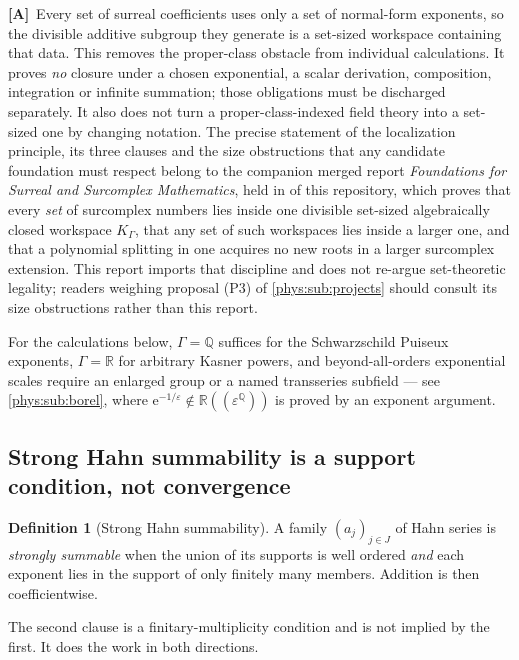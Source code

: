 \documentclass[11pt,letterpaper]{article}
\numberwithin{equation}{section}
\theoremstyle{definition}
\newtheorem{definition}[theorem]{Definition}
\theoremstyle{remark}
\newcommand{\R}{\mathbb R}
\newcommand{\Q}{\mathbb Q}
\newcommand{\eps}{\varepsilon}
\newcommand{\ee}{\mathrm e}
\newcommand{\TA}{\textcolor{TierA}{\textsf{\bfseries[A]}}}
\begin{document}
\TA\ Every set of surreal coefficients uses only a set of normal-form
exponents, so the divisible additive subgroup they generate is a set-sized
workspace containing that data. This removes the proper-class obstacle from
individual calculations. It proves \emph{no} closure under a chosen
exponential, a scalar derivation, composition, integration or infinite
summation; those obligations must be discharged separately. It also does not
turn a proper-class-indexed field theory into a set-sized one by changing
notation. The precise statement of the localization principle, its three
clauses and the size obstructions that any candidate foundation must respect
belong to the companion merged report \emph{Foundations for Surreal and
Surcomplex Mathematics}, held in
of this repository, which proves that every \emph{set} of surcomplex numbers
lies inside one divisible set-sized algebraically closed workspace
$K_{\Gamma}$, that any set of such workspaces lies inside a larger one, and
that a polynomial splitting in one acquires no new roots in a larger
surcomplex extension. This report imports that discipline and does not
re-argue set-theoretic legality; readers weighing proposal (P3) of
\cref{phys:sub:projects} should consult its size obstructions rather than this
report.

For the calculations below, $\Gamma=\Q$ suffices for the Schwarzschild
Puiseux exponents, $\Gamma=\R$ for arbitrary Kasner powers, and
beyond-all-orders exponential scales require an enlarged group or a named
transseries subfield --- see \cref{phys:sub:borel}, where
$\ee^{-1/\eps}\notin\R((\eps^{\Q}))$ is proved by an exponent argument.

\subsection{Strong Hahn summability is a support condition, not convergence}
\label{phys:sub:summability}

\begin{definition}[Strong Hahn summability]
\label{phys:def:strongsum}
A family $(a_{j})_{j\in J}$ of Hahn series is \emph{strongly summable} when the
union of its supports is well ordered \emph{and} each exponent lies in the
support of only finitely many members. Addition is then coefficientwise.
\end{definition}

The second clause is a finitary-multiplicity condition and is not implied by
the first. It does the work in both directions.
\end{document}
